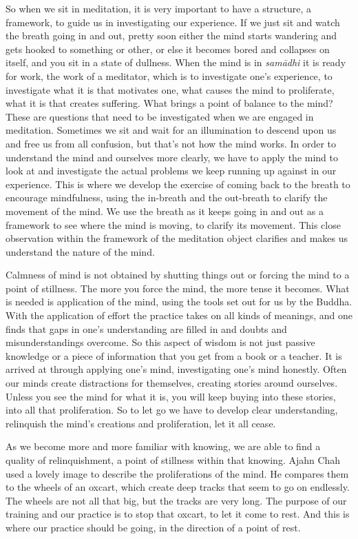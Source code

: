 So when we sit in meditation, it is very important to have a structure,
a framework, to guide us in investigating our experience. If we just sit
and watch the breath going in and out, pretty soon either the mind
starts wandering and gets hooked to something or other, or else it
becomes bored and collapses on itself, and you sit in a state of
dullness. When the mind is in \emph{samādhi} it is ready for work, the
work of a meditator, which is to investigate one's experience, to
investigate what it is that motivates one, what causes the mind to
proliferate, what it is that creates suffering. What brings a point of
balance to the mind? These are questions that need to be investigated
when we are engaged in meditation. Sometimes we sit and wait for an
illumination to descend upon us and free us from all confusion, but
that's not how the mind works. In order to understand the mind and
ourselves more clearly, we have to apply the mind to look at and
investigate the actual problems we keep running up against in our
experience. This is where we develop the exercise of coming back to the
breath to encourage mindfulness, using the in-breath and the out-breath
to clarify the movement of the mind. We use the breath as it keeps going
in and out as a framework to see where the mind is moving, to clarify
its movement. This close observation within the framework of the
meditation object clarifies and makes us understand the nature of the
mind.

Calmness of mind is not obtained by shutting things out or forcing the
mind to a point of stillness. The more you force the mind, the more
tense it becomes. What is needed is application of the mind, using the
tools set out for us by the Buddha. With the application of effort the
practice takes on all kinds of meanings, and one finds that gaps in
one's understanding are filled in and doubts and misunderstandings
overcome. So this aspect of wisdom is not just passive knowledge or a
piece of information that you get from a book or a teacher. It is
arrived at through applying one's mind, investigating one's mind
honestly. Often our minds create distractions for themselves, creating
stories around ourselves. Unless you see the mind for what it is, you
will keep buying into these stories, into all that proliferation. So to
let go we have to develop clear understanding, relinquish the mind's
creations and proliferation, let it all cease.

As we become more and more familiar with knowing, we are able to find a
quality of relinquishment, a point of stillness within that knowing.
Ajahn Chah used a lovely image to describe the proliferations of the
mind. He compares them to the wheels of an oxcart, which create deep
tracks that seem to go on endlessly. The wheels are not all that big,
but the tracks are very long. The purpose of our training and our
practice is to stop that oxcart, to let it come to rest. And this is
where our practice should be going, in the direction of a point of rest.



